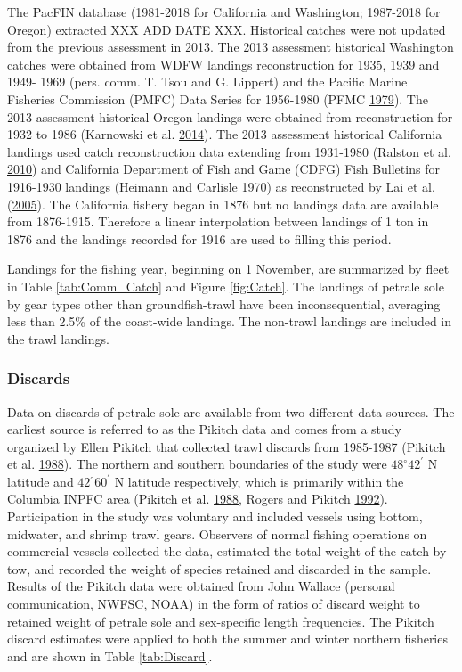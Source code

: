 \documentclass[12pt,]{article}
\begin{document}
The PacFIN database (1981-2018 for California and Washington; 1987-2018
for Oregon) extracted XXX ADD DATE XXX. Historical catches were not
updated from the previous assessment in 2013. The 2013 assessment
historical Washington catches were obtained from WDFW landings
reconstruction for 1935, 1939 and 1949- 1969 (pers. comm. T. Tsou and G.
Lippert) and the Pacific Marine Fisheries Commission (PMFC) Data Series
for 1956-1980 (PFMC \protect\hyperlink{ref-pfmc_data_1979}{1979}). The
2013 assessment historical Oregon landings were obtained from
reconstruction for 1932 to 1986 (Karnowski et al.
\protect\hyperlink{ref-karnowski_historical_2014}{2014}). The 2013
assessment historical California landings used catch reconstruction data
extending from 1931-1980 (Ralston et al.
\protect\hyperlink{ref-ralston_documentation_2010}{2010}) and California
Department of Fish and Game (CDFG) Fish Bulletins for 1916-1930 landings
(Heimann and Carlisle
\protect\hyperlink{ref-heimann_pacific_1970}{1970}) as reconstructed by
Lai et al. (\protect\hyperlink{ref-lai_stock_2005}{2005}). The
California fishery began in 1876 but no landings data are available from
1876-1915. Therefore a linear interpolation between landings of 1 ton in
1876 and the landings recorded for 1916 are used to filling this period.

Landings for the fishing year, beginning on 1 November, are summarized
by fleet in Table \ref{tab:Comm_Catch} and Figure \ref{fig:Catch}. The
landings of petrale sole by gear types other than groundfish-trawl have
been inconsequential, averaging less than 2.5\% of the coast-wide
landings. The non-trawl landings are included in the trawl landings.

\subsubsection{Discards}\label{discards}

Data on discards of petrale sole are available from two different data
sources. The earliest source is referred to as the Pikitch data and
comes from a study organized by Ellen Pikitch that collected trawl
discards from 1985-1987 (Pikitch et al.
\protect\hyperlink{ref-pikitch_evaluation_1988}{1988}). The northern and
southern boundaries of the study were \(48^\circ 42^\prime\) N latitude
and \(42^\circ 60^\prime\) N latitude respectively, which is primarily
within the Columbia INPFC area (Pikitch et al.
\protect\hyperlink{ref-pikitch_evaluation_1988}{1988}, Rogers and
Pikitch \protect\hyperlink{ref-rogers_numerical_1992}{1992}).
Participation in the study was voluntary and included vessels using
bottom, midwater, and shrimp trawl gears. Observers of normal fishing
operations on commercial vessels collected the data, estimated the total
weight of the catch by tow, and recorded the weight of species retained
and discarded in the sample. Results of the Pikitch data were obtained
from John Wallace (personal communication, NWFSC, NOAA) in the form of
ratios of discard weight to retained weight of petrale sole and
sex-specific length frequencies. The Pikitch discard estimates were
applied to both the summer and winter northern fisheries and are shown
in Table \ref{tab:Discard}.
\end{document}
